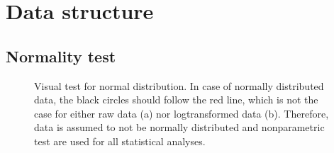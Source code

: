 \section{Data structure}

\subsection{Normality test}
\begin{center}
	\begin{figure}[H]
		\caption[Testing normal distribution]{Visual test for normal distribution. In case of normally distributed data, the black circles should follow the red line, which is not the case for either raw data (a) nor logtransformed data (b). Therefore, data is assumed to not be normally distributed and nonparametric test are used for all statistical analyses.}
		\label{fig:NormDis}
	\end{figure}
\end{center}



